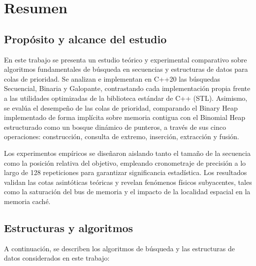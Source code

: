 \documentclass[11pt,letterpaper]{article}
\begin{document}
\pagestyle{plain}
\tableofcontents
\newpage

\pagestyle{fancy}

\section{Resumen}

\subsection{Propósito y alcance del estudio}
En este trabajo se presenta un estudio teórico y experimental comparativo sobre algoritmos fundamentales de búsqueda en secuencias y estructuras de datos para colas de prioridad. Se analizan e implementan en C++20 las búsquedas Secuencial, Binaria y Galopante, contrastando cada implementación propia frente a las utilidades optimizadas de la biblioteca estándar de C++ (STL). Asimismo, se evalúa el desempeño de las colas de prioridad, comparando el Binary Heap implementado de forma implícita sobre memoria contigua con el Binomial Heap estructurado como un bosque dinámico de punteros, a través de sus cinco operaciones: construcción, consulta de extremo, inserción, extracción y fusión.

Los experimentos empíricos se diseñaron aislando tanto el tamaño de la secuencia como la posición relativa del objetivo, empleando cronometraje de precisión a lo largo de 128 repeticiones para garantizar significancia estadística. Los resultados validan las cotas asintóticas teóricas y revelan fenómenos físicos subyacentes, tales como la saturación del bus de memoria y el impacto de la localidad espacial en la memoria caché.

\subsection{Estructuras y algoritmos}

A continuación, se describen los algoritmos de búsqueda y las estructuras de datos considerados en este trabajo:
\end{document}
